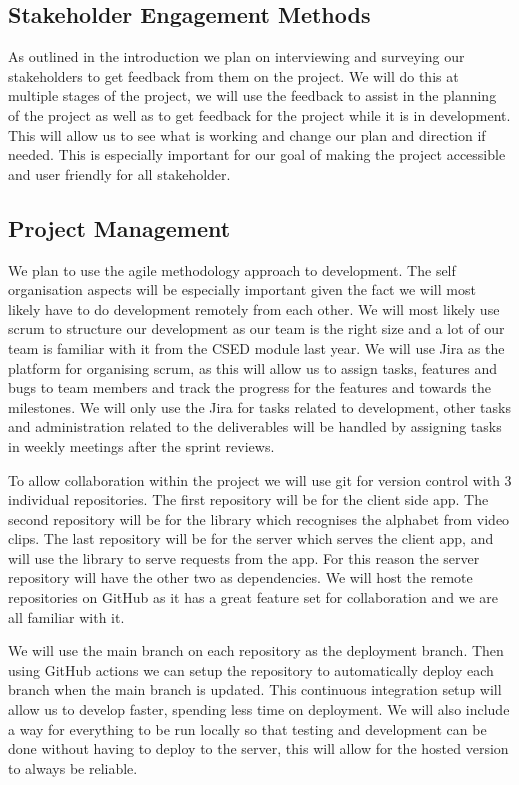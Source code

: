 \documentclass[10pt]{article}
\begin{document}
  \subsection{Stakeholder Engagement Methods}

  As outlined in the introduction we plan on interviewing and surveying our stakeholders to get 
  feedback from them on the project. We will do this at multiple stages of the project, we will use 
  the feedback to assist in the planning of the project as well as to get feedback for the project 
  while it is in development. This will allow us to see what is working and change our plan and 
  direction if needed. This is especially important for our goal of making the project accessible 
  and user friendly for all stakeholder.

  \subsection{Project Management}

  We plan to use the agile methodology approach to development. The self organisation aspects will 
  be especially important given the fact we will most likely have to do development remotely from 
  each other. We will most likely use scrum to structure our development as our  team is the right 
  size and a lot of our team is familiar with it from the CSED module last year.  We will use Jira 
  as the platform for organising scrum, as this will allow us to assign tasks, features and bugs to 
  team members and track the progress for the features and towards the milestones. We will only use 
  the Jira for tasks related to development, other tasks and administration related to the 
  deliverables will be handled by assigning tasks in weekly meetings after the sprint reviews.

  To allow collaboration within the project we will use git for version control with 3 individual 
  repositories. The first repository will be for the client side app. The second repository will be 
  for the library which recognises the alphabet from video clips. The last repository will be for 
  the server which serves the client app, and will use the library to serve requests from the app. 
  For this reason the server repository will have the other two as dependencies. We will host the 
  remote repositories on GitHub as it has a great feature set for collaboration and we are all 
  familiar with it.

  We will use the main branch on each repository as the deployment branch. Then using GitHub actions 
  we can setup the repository to automatically deploy each branch when the main branch is updated. 
  This continuous integration setup will allow us to develop faster, spending less time on 
  deployment. We will also include a way for everything to be run locally so that testing and 
  development can be done without having to deploy to the server, this will allow for the hosted 
  version to always be reliable.
\end{document}
